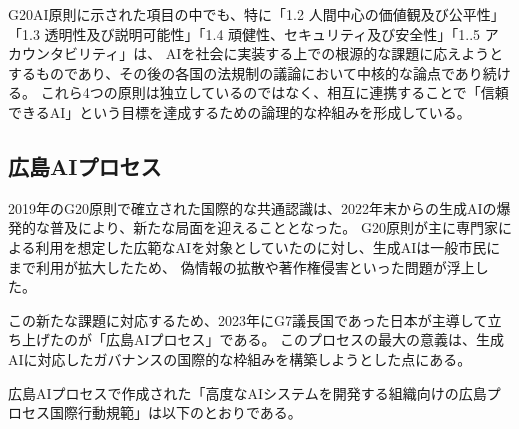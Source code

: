 G20AI原則に示された項目の中でも、特に「1.2 人間中心の価値観及び公平性」「1.3 透明性及び説明可能性」「1.4 頑健性、セキュリティ及び安全性」「1..5 アカウンタビリティ」は、
AIを社会に実装する上での根源的な課題に応えようとするものであり、その後の各国の法規制の議論において中核的な論点であり続ける。
これら4つの原則は独立しているのではなく、相互に連携することで「信頼できるAI」という目標を達成するための論理的な枠組みを形成している。

\subsection{広島AIプロセス}

2019年のG20原則で確立された国際的な共通認識は、2022年末からの生成AIの爆発的な普及により、新たな局面を迎えることとなった。
G20原則が主に専門家による利用を想定した広範なAIを対象としていたのに対し、生成AIは一般市民にまで利用が拡大したため、
偽情報の拡散や著作権侵害といった問題が浮上した。

この新たな課題に対応するため、2023年にG7議長国であった日本が主導して立ち上げたのが「広島AIプロセス」である。
このプロセスの最大の意義は、生成AIに対応したガバナンスの国際的な枠組みを構築しようとした点にある。


広島AIプロセスで作成された「高度なAIシステムを開発する組織向けの広島プロセス国際行動規範」は以下のとおりである。

